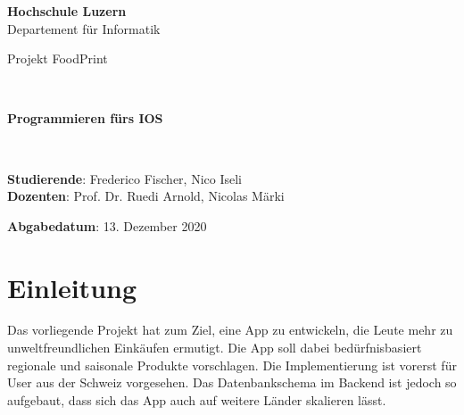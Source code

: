 \documentclass[12pt,titlepage]{article}
\begin{document}
\thispagestyle{empty}

\begin{center}
\textbf{Hochschule Luzern}\\
Departement für Informatik\\[12\baselineskip]

\begin{Huge}
Projekt FoodPrint
\end{Huge} \\[6\baselineskip]

\begin{large}
\textbf{Programmieren fürs IOS}
\end{large} \\[6\baselineskip]

\begin{large}
\textbf{Studierende}: Frederico Fischer, Nico Iseli\\
\textbf{Dozenten}: Prof. Dr. Ruedi Arnold, Nicolas Märki\

\textbf{Abgabedatum}: 13. Dezember 2020 \\ 
\end{large}
\end{center}
\newpage


\section*{Einleitung}
Das vorliegende Projekt hat zum Ziel, eine App zu entwickeln, die Leute mehr zu unweltfreundlichen Einkäufen ermutigt. Die App soll dabei bedürfnisbasiert regionale und saisonale Produkte vorschlagen. Die Implementierung ist vorerst für User aus der Schweiz vorgesehen. Das Datenbankschema im Backend ist jedoch so aufgebaut, dass sich das App auch auf weitere Länder skalieren lässt.
\end{document}
